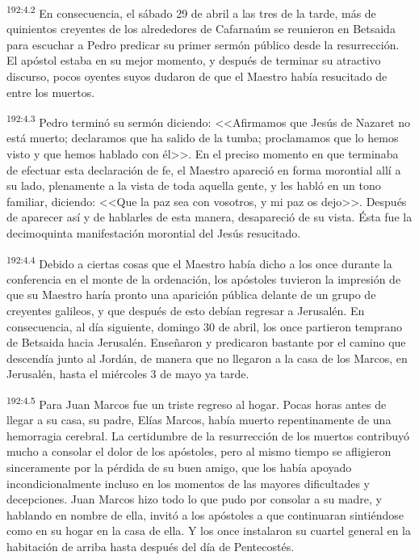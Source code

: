 \par 
\textsuperscript{192:4.2} En consecuencia, el sábado 29 de abril a las tres de la tarde, más de quinientos creyentes de los alrededores de Cafarnaúm se reunieron en Betsaida para escuchar a Pedro predicar su primer sermón público desde la resurrección. El apóstol estaba en su mejor momento, y después de terminar su atractivo discurso, pocos oyentes suyos dudaron de que el Maestro había resucitado de entre los muertos.

\par 
\textsuperscript{192:4.3} Pedro terminó su sermón diciendo: <<Afirmamos que Jesús de Nazaret no está muerto; declaramos que ha salido de la tumba; proclamamos que lo hemos visto y que hemos hablado con él>>. En el preciso momento en que terminaba de efectuar esta declaración de fe, el Maestro apareció en forma morontial allí a su lado, plenamente a la vista de toda aquella gente, y les habló en un tono familiar, diciendo: <<Que la paz sea con vosotros, y mi paz os dejo>>. Después de aparecer así y de hablarles de esta manera, desapareció de su vista. Ésta fue la decimoquinta manifestación morontial del Jesús resucitado.

\par 
\textsuperscript{192:4.4} Debido a ciertas cosas que el Maestro había dicho a los once durante la conferencia en el monte de la ordenación, los apóstoles tuvieron la impresión de que su Maestro haría pronto una aparición pública delante de un grupo de creyentes galileos, y que después de esto debían regresar a Jerusalén. En consecuencia, al día siguiente, domingo 30 de abril, los once partieron temprano de Betsaida hacia Jerusalén. Enseñaron y predicaron bastante por el camino que descendía junto al Jordán, de manera que no llegaron a la casa de los Marcos, en Jerusalén, hasta el miércoles 3 de mayo ya tarde.

\par 
\textsuperscript{192:4.5} Para Juan Marcos fue un triste regreso al hogar. Pocas horas antes de llegar a su casa, su padre, Elías Marcos, había muerto repentinamente de una hemorragia cerebral. La certidumbre de la resurrección de los muertos contribuyó mucho a consolar el dolor de los apóstoles, pero al mismo tiempo se afligieron sinceramente por la pérdida de su buen amigo, que los había apoyado incondicionalmente incluso en los momentos de las mayores dificultades y decepciones. Juan Marcos hizo todo lo que pudo por consolar a su madre, y hablando en nombre de ella, invitó a los apóstoles a que continuaran sintiéndose como en su hogar en la casa de ella. Y los once instalaron su cuartel general en la habitación de arriba hasta después del día de Pentecostés.

